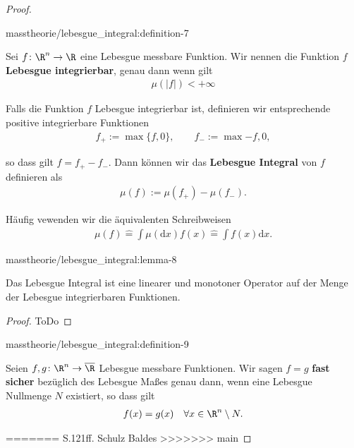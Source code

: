 \documentclass[letterpaper,10pt,english]{jupyterBook}
\begin{document}
\begin{proof}
\begin{definition}{}{masstheorie/lebesgue_integral:definition-7}
\par
Sei \(f \colon \R^n \rightarrow \R\) eine Lebesgue messbare Funktion.
Wir nennen die Funktion \(f\) \textbf{Lebesgue integrierbar}, genau dann wenn gilt
\begin{align*}
\mu(|f|) < +\infty
\end{align*}
\par
Falls die Funktion \(f\) Lebesgue integrierbar ist, definieren wir entsprechende positive integrierbare Funktionen
\begin{align*}
f_+ := \max \lbrace f, 0 \rbrace, \qquad f_- := \max{-f, 0},
\end{align*}
\par
so dass gilt \(f = f_+ - f_-\).
Dann können wir das \textbf{Lebesgue Integral} von \(f\) definieren als
\begin{align*}
\mu(f) := \mu(f_+) - \mu(f_-).
\end{align*}
\par
Häufig vewenden wir die äquivalenten Schreibweisen
\begin{align*}
\mu(f) \hat{=} \int \mu(\mathrm{d}x) f(x) \hat{=} \int f(x) \mathrm{d}x.
\end{align*}\end{definition}
\begin{lemma}{}{masstheorie/lebesgue_integral:lemma-8}



\par
Das Lebesgue Integral ist eine linearer und monotoner Operator auf der Menge der Lebesgue integrierbaren Funktionen.
\end{lemma}

\begin{proof}
 ToDo
\end{proof}
\begin{definition}{}{masstheorie/lebesgue_integral:definition-9}



\par
Seien \(f,g \colon \R^n \rightarrow \overline{\R}\) Lebesgue messbare Funktionen.
Wir sagen \(f = g\) \textbf{fast sicher} bezüglich des Lebesgue Maßes genau dann, wenn eine Lebesgue Nullmenge \(N\) existiert, so dass gilt
\begin{align*}
f(x) = g(x) \quad \forall x \in \R^n \setminus N.
\end{align*}\end{definition}
=======
S.121ff. Schulz Baldes
>>>>>>> main



\end{proof}
\end{document}
